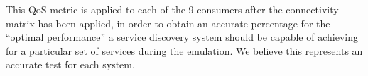 This QoS metric is applied to each of the 9 consumers after the connectivity matrix has been applied, in order to obtain an accurate percentage for the ``optimal performance'' a service discovery system should be capable of achieving for a particular set of services during the emulation. We believe this represents an accurate test for each system.

\normalsize